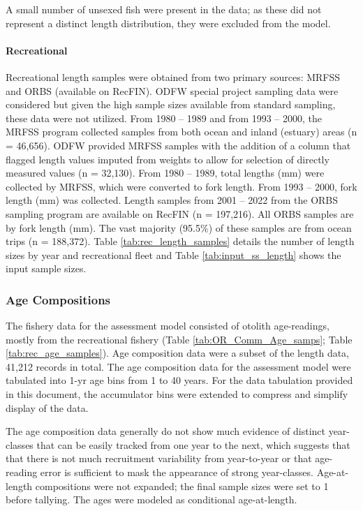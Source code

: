 \documentclass[11pt,
  letterpaper,
]{article}
\begin{document}
A small number of unsexed fish were present in the data; as these did not represent a distinct length distribution, they were excluded from the model.

\hypertarget{recreational}{%
\paragraph{Recreational}\label{recreational}}

Recreational length samples were obtained from two primary sources: MRFSS and ORBS (available on RecFIN). ODFW special project sampling data were considered but given the high sample sizes available from standard sampling, these data were not utilized. From 1980 -- 1989 and from 1993 -- 2000, the MRFSS program collected samples from both ocean and inland (estuary) areas (n = 46,656). ODFW provided MRFSS samples with the addition of a column that flagged length values imputed from weights to allow for selection of directly measured values (n = 32,130). From 1980 -- 1989, total lengths (mm) were collected by MRFSS, which were converted to fork length. From 1993 -- 2000, fork length (mm) was collected. Length samples from 2001 -- 2022 from the ORBS sampling program are available on RecFIN (n = 197,216). All ORBS samples are by fork length (mm). The vast majority (95.5\%) of these samples are from ocean trips (n = 188,372). Table \ref{tab:rec_length_samples} details the number of length sizes by year and recreational fleet and Table \ref{tab:input_ss_length} shows the input sample sizes.

\hypertarget{age-compositions}{%
\subsubsection{Age Compositions}\label{age-compositions}}

The fishery data for the assessment model consisted of otolith age-readings, mostly from the recreational fishery (Table \ref{tab:OR_Comm_Age_samps}; Table \ref{tab:rec_age_samples}). Age composition data were a subset of the length data, 41,212 records in total. The age composition data for the assessment model were tabulated into 1-yr age bins from 1 to 40 years. For the data tabulation provided in this document, the accumulator bins were extended to compress and simplify display of the data.

The age composition data generally do not show much evidence of distinct year-classes that can be easily tracked from one year to the next, which suggests that that there is not much recruitment variability from year-to-year or that age-reading error is sufficient to mask the appearance of strong year-classes. Age-at-length compositions were not expanded; the final sample sizes were set to 1 before tallying. The ages were modeled as conditional age-at-length.
\end{document}
